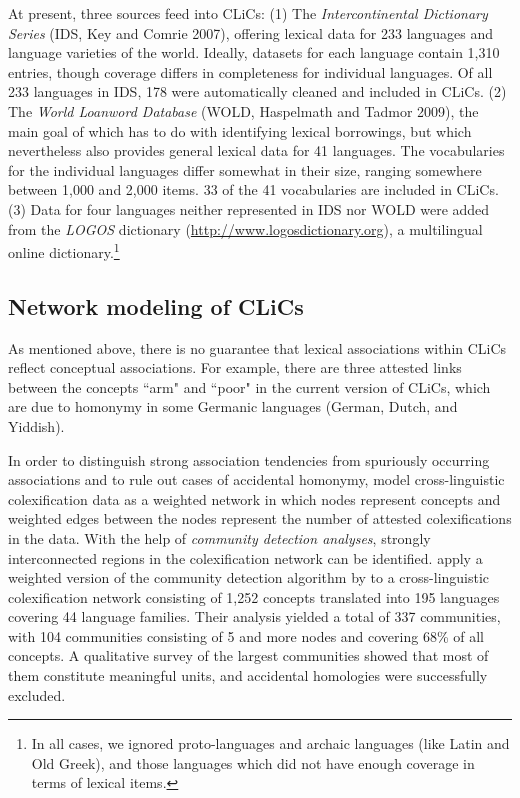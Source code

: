 At present, three sources feed into CLiCs: (1) The \emph{Intercontinental Dictionary Series} (IDS, Key and
Comrie 2007), offering lexical data for 233 languages and language varieties of the world. Ideally,
datasets for each language contain 1,310 entries, though coverage differs in completeness for
individual languages. Of all 233 languages in IDS, 178 were automatically cleaned and included in
CLiCs. (2) The \emph{World Loanword Database} (WOLD, Haspelmath and Tadmor 2009), the main goal of which
has to do with identifying lexical borrowings, but which nevertheless also provides general lexical
data for 41 languages. The vocabularies for the individual languages differ somewhat in their size,
ranging somewhere between 1,000 and 2,000 items. 33 of the 41 vocabularies are included in CLiCs.
(3) Data for four languages neither represented in IDS nor WOLD were added from the \emph{LOGOS} dictionary
(\url{http://www.logosdictionary.org}), a multilingual online dictionary.\footnote{In all cases, we ignored proto-languages and
archaic languages (like Latin and Old Greek), and those languages which
did not have enough coverage in terms of lexical items.}

\nocite{Wold2009}
\subsection{Network modeling of CLiCs}
As mentioned above, there is no guarantee that lexical associations within CLiCs reflect conceptual associations. For example, there are three attested links between the
concepts ``arm" and ``poor" in the current version of CLiCs, which are due to homonymy in some
Germanic languages (German, Dutch, and Yiddish).
 
In order to distinguish strong
association tendencies from
spuriously occurring associations and to rule out cases of accidental homonymy,  model cross-linguistic colexification data as a weighted network
in which nodes represent concepts and weighted edges between the nodes represent the number of
attested colexifications in the data.  With the help of \emph{community detection analyses}, strongly
interconnected regions in the colexification network can be identified.  apply
a weighted version of the community detection algorithm by  to a
cross-linguistic colexification network consisting of 1,252 concepts translated into 195 languages
covering 44 language families. Their analysis yielded a total of 337 communities, with 104 communities
consisting of 5 and more nodes and covering 68\% of all concepts. A qualitative survey of the
largest communities showed that most of them constitute meaningful units, and accidental homologies
were successfully excluded.

